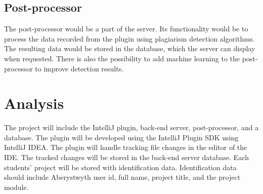 \subsection{Post-processor}
The post-processor would be a part of the server. Its functionality would be to process the data recorded from the plugin using plagiarism detection algorithms. The resulting data would be stored in the database, which the server can display when requested. There is also the possibility to add machine learning to the post-processor to improve detection results.

\section{Analysis}
\label{sec:analysis}
The project will include the IntelliJ plugin, back-end server, post-processor, and a database. The plugin will be developed using the IntelliJ Plugin SDK using IntelliJ IDEA. The plugin will handle tracking file changes in the editor of the IDE. The tracked changes will be stored in the back-end server database. Each students' project will be stored with identification data. Identification data should include Aberystwyth user id, full name, project title, and the project module.

